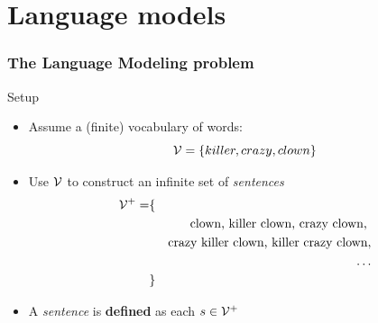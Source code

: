 \section{Language models}

\begin{frame}
\frametitle{The Language Modeling problem}
\begin{block}{Setup}
\begin{itemize}[<+->]
\item Assume a (finite) vocabulary of words:
\[ {\cal V} = \{ killer, crazy, clown \} \]
\item Use ${\cal V}$ to construct an infinite set of \textit{sentences} 
\begin{eqnarray*} 
{\cal V}^+ = & \{ & \\
&& \mbox{clown, killer clown, crazy clown, } \\
&& \mbox{crazy killer clown, killer crazy clown}, \\
&& \ldots \\
& \} &
\end{eqnarray*}
\item A \textit{sentence} is \textbf{defined} as each $s \in {\cal V}^+$
\end{itemize}
\end{block}
\end{frame}


